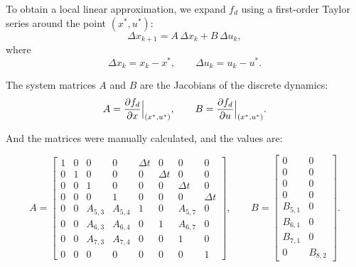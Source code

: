 \documentclass[a4paper,11pt,oneside]{book}
\begin{document}
To obtain a local linear approximation, we expand $f_d$ using a first-order Taylor series 
around the point $(x^\ast,u^\ast)$:
\begin{equation}
\Delta x_{k+1} = A \, \Delta x_k + B \, \Delta u_k,
\end{equation}
where
\begin{equation}
\Delta x_k = x_k - x^\ast, 
\qquad 
\Delta u_k = u_k - u^\ast.
\end{equation}

The system matrices $A$ and $B$ are the Jacobians of the discrete dynamics:
\begin{equation}
A = \frac{\partial f_d}{\partial x}\Big|_{(x^\ast,u^\ast)}, 
\qquad 
B = \frac{\partial f_d}{\partial u}\Big|_{(x^\ast,u^\ast)}. \\
\\
\end{equation}

\begin{justify}
    And the matrices were manually calculated, and the values are:    
\end{justify}
\[
A=
\begin{bmatrix}
1 & 0 & 0 & 0 & \Delta t & 0        & 0        & 0 \\
0 & 1 & 0 & 0 & 0        & \Delta t & 0        & 0 \\
0 & 0 & 1 & 0 & 0        & 0        & \Delta t & 0 \\
0 & 0 & 0 & 1 & 0        & 0        & 0        & \Delta t \\
0 & 0 & A_{5,3} & A_{5,4} & 1 & 0 & A_{5,7} & 0 \\
0 & 0 & A_{6,3} & A_{6,4} & 0 & 1 & A_{6,7} & 0 \\
0 & 0 & A_{7,3} & A_{7,4} & 0 & 0 & 1      & 0 \\
0 & 0 & 0      & 0      & 0 & 0 & 0      & 1
\end{bmatrix},\qquad
B=
\begin{bmatrix}
0 & 0 \\
0 & 0 \\
0 & 0 \\
0 & 0 \\
B_{5,1} & 0 \\
B_{6,1} & 0 \\
B_{7,1} & 0 \\
0       & B_{8,2}
\end{bmatrix}.
\]
\end{document}
